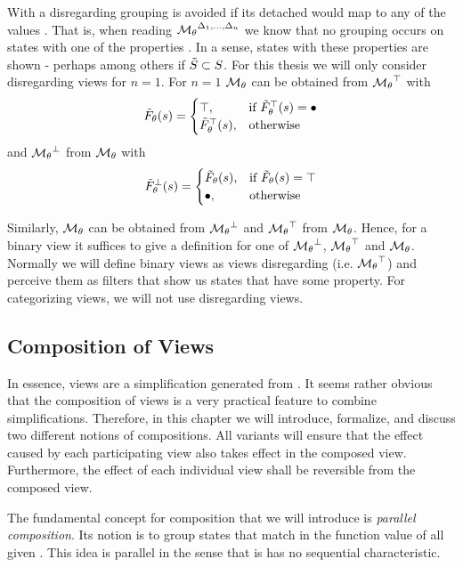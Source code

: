 \documentclass[preview]{standalone}
\begin{document}
With a disregarding \viewN grouping is avoided if its detached \grpfctN would map to any of the values \disregardelements. That is, when reading ${{{{\mathcal{M}}}}_{{\theta}}}^{{{\Delta}_1, \dots, {\Delta}_n}}$ we know that no grouping occurs on states with one of the properties \disregardelements. In a sense, states with these properties are shown - perhaps among others if ${\tilde{{S}}} \subset {S}$. For this thesis we will only consider disregarding views for $n = 1$.  
For $n = 1$ ${{{{\mathcal{M}}}}_{{\theta}}}$ can be obtained from ${{{{\mathcal{M}}}}_{{\theta}}}^{\top}$ with 
\[
{\tilde{F}_{{\theta}}}({s}) = 
\begin{cases}
	{\top},				& \text{if } {\tilde{F}_{\ensuremath{{\theta}}}}^{\top}({s}) = {\bullet}  \\
	{\tilde{F}_{{\theta}}}^{\top}({s}),       		& \text{otherwise }
\end{cases}
\]
and ${{{{\mathcal{M}}}}_{{\theta}}}^{\bot}$ from ${{{{\mathcal{M}}}}_{{\theta}}}$ with
\[
{\tilde{F}_{{\theta}}}^{\bot}({s}) = 
\begin{cases}
	{\tilde{F}_{\ensuremath{{\theta}}}}({s}),       		&\text{if } {\tilde{F}_{\ensuremath{{\theta}}}}({s}) = {\top}  \\ 
	{\bullet},				&\text{otherwise } 
\end{cases}
\]

Similarly, ${{{{\mathcal{M}}}}_{{\theta}}}$ can be obtained from ${{{{\mathcal{M}}}}_{{\theta}}}^{\bot}$ and ${{{{\mathcal{M}}}}_{{\theta}}}^{\top}$ from ${{{{\mathcal{M}}}}_{{\theta}}}$. Hence, for a binary view it suffices to give a definition for one of ${{{{\mathcal{M}}}}_{{\theta}}}^{\bot}$, ${{{{\mathcal{M}}}}_{{\theta}}}^{\top}$ and ${{{{\mathcal{M}}}}_{{\theta}}}$. Normally we will define binary views as views disregarding \hasppty (i.e. ${{{{\mathcal{M}}}}_{{\theta}}}^{\top}$) and perceive them as filters that show us states that have some property. For categorizing views, we will not use disregarding views.

\subsection{Composition of Views} \label{ch:composition}
In essence, views are a simplification generated from \achgphN. It seems rather obvious that the composition of views is a very practical feature to combine simplifications. Therefore, in this chapter we will introduce, formalize, and discuss two different notions of compositions. All variants will ensure that the effect caused by each participating view also takes effect in the composed view. Furthermore, the effect of each individual view shall be reversible from the composed view.

The fundamental concept for composition that we will introduce is \emph{parallel composition}. Its notion is to group states that match in the function value of all given \grpfctsN. This idea is parallel in the sense that is has no sequential characteristic.
\end{document}
